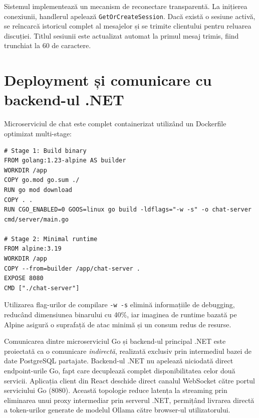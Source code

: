 Sistemul implementează un mecanism de reconectare transparentă. La inițierea conexiunii, handlerul apelează \texttt{GetOrCreateSession}. Dacă există o sesiune activă, se reîncarcă istoricul complet al mesajelor și se trimite clientului pentru reluarea discuției. Titlul sesiunii este actualizat automat la primul mesaj trimis, fiind trunchiat la 60 de caractere.

\section{Deployment și comunicare cu backend-ul .NET}

Microserviciul de chat este complet containerizat utilizând un Dockerfile optimizat multi-stage:
\begin{lstlisting}[language=Docker]
# Stage 1: Build binary
FROM golang:1.23-alpine AS builder
WORKDIR /app
COPY go.mod go.sum ./
RUN go mod download
COPY . .
RUN CGO_ENABLED=0 GOOS=linux go build -ldflags="-w -s" -o chat-server cmd/server/main.go

# Stage 2: Minimal runtime
FROM alpine:3.19
WORKDIR /app
COPY --from=builder /app/chat-server .
EXPOSE 8080
CMD ["./chat-server"]
\end{lstlisting}

Utilizarea flag-urilor de compilare \texttt{-w -s} elimină informațiile de debugging, reducând dimensiunea binarului cu 40\%, iar imaginea de runtime bazată pe Alpine asigură o suprafață de atac minimă și un consum redus de resurse.

Comunicarea dintre microserviciul Go și backend-ul principal .NET este proiectată ca o comunicare \textit{indirectă}, realizată exclusiv prin intermediul bazei de date PostgreSQL partajate. Backend-ul .NET nu apelează niciodată direct endpoint-urile Go, fapt care decuplează complet disponibilitatea celor două servicii. Aplicația client din React deschide direct canalul WebSocket către portul serviciului Go (8080). Această topologie reduce latența la streaming prin eliminarea unui proxy intermediar prin serverul .NET, permițând livrarea directă a token-urilor generate de modelul Ollama către browser-ul utilizatorului.
